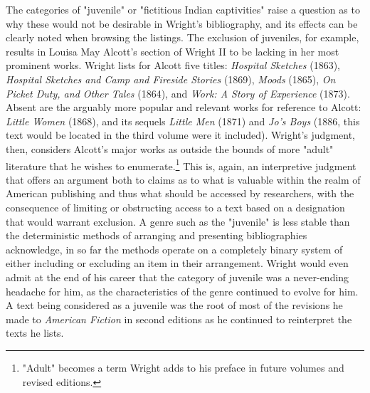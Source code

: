 The categories of "juvenile" or "fictitious Indian captivities" raise a question as to why these would not be desirable in Wright's bibliography, and its effects can be clearly noted when browsing the listings. The exclusion of juveniles, for example, results in Louisa May Alcott's section of Wright II to be lacking in her most prominent works. Wright lists for Alcott five titles: \textit{Hospital Sketches} (1863), \textit{Hospital Sketches and Camp and Fireside Stories} (1869), \textit{Moods} (1865), \textit{On Picket Duty, and Other Tales} (1864), and \textit{Work: A Story of Experience} (1873). Absent are the arguably more popular and relevant works for reference to Alcott: \textit{Little Women} (1868), and its sequels   \textit{Little Men} (1871) and \textit{Jo's Boys} (1886, this text would be located in the third volume were it included). Wright's judgment, then, considers Alcott's major works as outside the bounds of more "adult" literature that he wishes to enumerate.\footnote{"Adult" becomes a term Wright adds to his preface in future volumes and revised editions.\autocite[vii]{wright_american_1957}} This is, again, an interpretive judgment that offers an argument both to claims as to what is valuable within the realm of American publishing and thus what should be accessed by researchers, with the consequence of limiting or obstructing access to a text based on a designation that would warrant exclusion. A genre such as the "juvenile" is less stable than the deterministic methods of arranging and presenting bibliographies acknowledge, in so far the methods operate on a completely binary system of either including or excluding an item in their arrangement. Wright would even admit at the end of his career that the category of juvenile was a never-ending headache for him, as the characteristics of the genre continued to evolve for him. A text being considered as a juvenile was the root of most of the revisions he made to \textit{American Fiction} in second editions as he continued to reinterpret the texts he lists.\autocite{wright_pursuit_1966}

